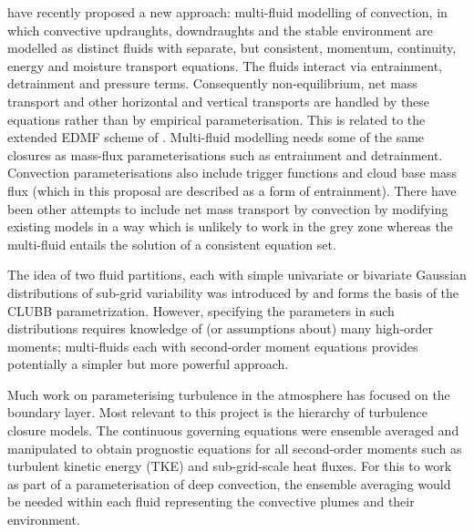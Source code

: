 \documentclass[11pt,a4paper]{article}
\begin{document}
\cite{TWV+18,WM19} have recently proposed a new approach: multi-fluid modelling of convection, in which convective updraughts, downdraughts and the stable environment are modelled as distinct fluids with separate, but consistent, momentum, continuity, energy and moisture transport equations. The fluids interact via entrainment, detrainment and pressure terms. Consequently non-equilibrium, net mass transport and other horizontal and vertical transports are handled by these equations rather than by empirical parameterisation. This is related to the extended EDMF scheme of \cite{TKP+18}. Multi-fluid modelling needs some of the same closures as mass-flux parameterisations such as entrainment and detrainment. Convection parameterisations also include trigger functions and cloud base mass flux (which in this proposal are described as a form of entrainment). There have been other attempts to include net mass transport by convection \cite[]{KB08,MB19} by modifying existing models in a way which is unlikely to work in the grey zone whereas the multi-fluid entails the solution of a consistent equation set.

The idea of two fluid partitions, each with simple univariate or bivariate Gaussian distributions of sub-grid variability was introduced by \cite{GLC02} and forms the basis of the CLUBB parametrization. However, specifying the parameters in such distributions requires knowledge of (or assumptions about) many high-order moments; multi-fluids each with second-order moment equations provides potentially a simpler but more powerful approach.

Much work on parameterising turbulence in the atmosphere has focused on the boundary layer. Most relevant to this project is the \citet{mellor1973,mellor1974,mellor1982} hierarchy of turbulence closure models. The continuous governing equations were ensemble averaged and manipulated to obtain prognostic equations for all second-order moments such as turbulent kinetic energy (TKE) and sub-grid-scale heat fluxes. For this to work as part of a parameterisation of deep convection, the ensemble averaging would be needed within each fluid representing the convective plumes and their environment.
\end{document}
